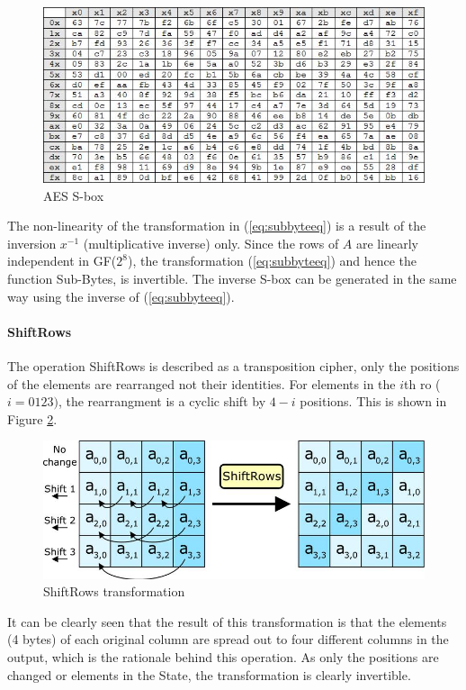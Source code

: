 \documentclass[a4paper,10pt]{report}
\begin{document}
\begin{figure}[htb]
\centering
\includegraphics[scale=0.5]{images/sbox.jpg}
\caption{AES S-box}
\label{fig:sbox}
\end{figure}

The non-linearity of the transformation in (\ref{eq:subbyteeq}) is a result of the inversion $x^{-1}$ (multiplicative inverse) only. Since the rows of $A$ are linearly independent in GF($2^{8}$), the transformation (\ref{eq:subbyteeq}) and hence the function Sub-Bytes, is invertible. The inverse S-box can be generated in the same way using the inverse of (\ref{eq:subbyteeq}).

\paragraph{ShiftRows}

The operation ShiftRows is described as a transposition cipher, only the positions of the elements are rearranged not their identities. For elements in the $i$th ro ($i = 0 1 2 3)$, the rearrangment is a cyclic shift by $4 - i$ positions. This is shown in Figure \ref{fig:shiftrows}.

\begin{figure}[htb]
\centering
\includegraphics[scale=0.3]{images/shiftrows.jpg}
\caption{ShiftRows transformation}
\label{fig:shiftrows}
\end{figure}

It can be clearly seen that the result of this transformation is that the elements (4 bytes) of each original column are spread out to four different columns in the output, which is the rationale behind this operation. As only the positions are changed or elements in the State, the transformation is clearly invertible. 
\end{document}
